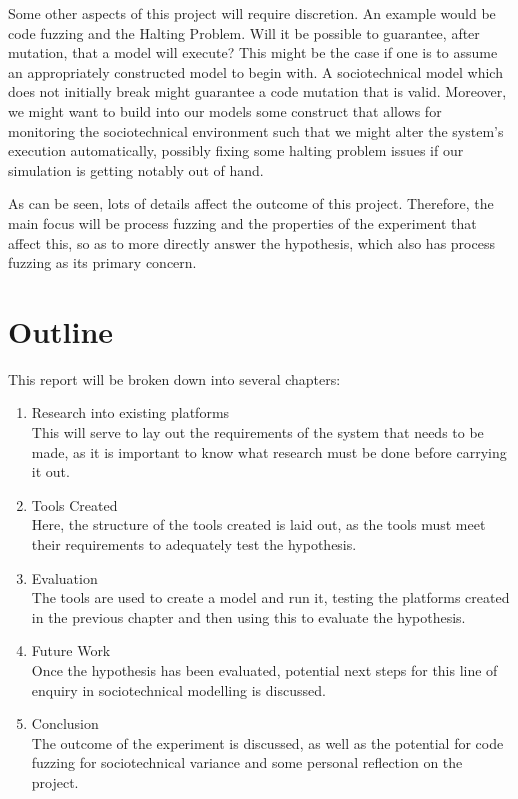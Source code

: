 Some other aspects of this project will require discretion. An example would be code fuzzing and the Halting Problem. Will it be possible to guarantee, after mutation, that a model will execute? This might be the case if one is to assume an appropriately constructed model to begin with. A sociotechnical model which does not initially break might guarantee a code mutation that is valid. Moreover, we might want to build into our models some construct that allows for monitoring the sociotechnical environment such that we might alter the system's execution automatically, possibly fixing some halting problem issues if our simulation is getting notably out of hand. \par%

As can be seen, lots of details affect the outcome of this project. Therefore, the main focus will be process fuzzing and the properties of the experiment that affect this, so as to more directly answer the hypothesis, which also has process fuzzing as its primary concern. \par%


\section{Outline}
\label{outline}
This report will be broken down into several chapters: 
\begin{enumerate}
    \item Research into existing platforms\hfill \\
        This will serve to lay out the requirements of the system that needs to be made, as it is important to know what research must be done before carrying it out. 
    \item Tools Created\hfill \\
        Here, the structure of the tools created is laid out, as the tools must meet their requirements to adequately test the hypothesis.
    \item Evaluation\hfill \\
        The tools are used to create a model and run it, testing the platforms created in the previous chapter and then using this to evaluate the hypothesis.
    \item Future Work\hfill \\
        Once the hypothesis has been evaluated, potential next steps for this line of enquiry in sociotechnical modelling is discussed.
    \item Conclusion\hfill \\
        The outcome of the experiment is discussed, as well as the potential for code fuzzing for sociotechnical variance and some personal reflection on the project.
\end{enumerate}